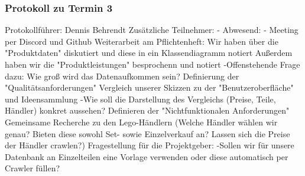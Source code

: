 \subsubsection{Protokoll zu Termin 3}
Protokollführer: Dennis Behrendt \newline
Zusätzliche Teilnehmer: - \newline
Abwesend: - \newline \newline
Meeting per Discord und Github \newline
Weiterarbeit am Pflichtenheft: \newline
Wir haben über die "Produktdaten" diskutiert und diese in ein Klassendiagramm notiert \newline
Außerdem haben wir die "Produktleistungen" besprochenn und notiert \newline
 -Offenstehende Frage dazu: Wie groß wird das Datenaufkommen sein? \newline
Definierung der "Qualitätsanforderungen" \newline
Vergleich unserer Skizzen zu der "Benutzeroberfläche" und Ideensammlung \newline
 -Wie soll die Darstellung des Vergleichs (Preise, Teile, Händler) konkret aussehen? \newline
Definieren der "Nichtfunktionalen Anforderungen" \newline
Gemeinsame Recherche zu den Lego-Händlern (Welche Händler wählen wir genau? Bieten diese sowohl Set- sowie Einzelverkauf an? Lassen sich die Preise der Händler crawlen?) \newline
Fragestellung für die Projektgeber: \newline
 -Sollen wir für unsere Datenbank an Einzelteilen eine Vorlage verwenden oder diese automatisch per Crawler füllen? \newline
 

